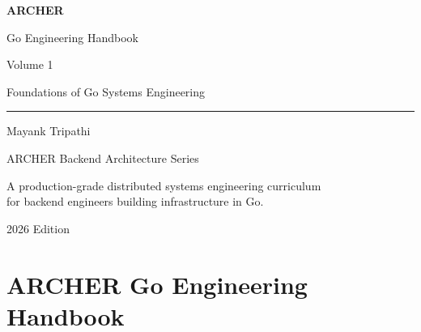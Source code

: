 \documentclass[11pt,openany]{book}
\author{}
\date{}
\begin{document}

\begin{titlepage}

\pagecolor{archerblue}
\color{white}

\vspace*{3cm}

\begin{center}

{\Huge \bfseries ARCHER}

\vspace{0.5cm}

{\Huge Go Engineering Handbook}

\vspace{1cm}

{\LARGE Volume 1}

\vspace{0.5cm}

{\Large Foundations of Go Systems Engineering}

\vspace{2cm}

\rule{0.8\textwidth}{0.5pt}

\vspace{1cm}

{\Large Mayank Tripathi}

\vspace{0.5cm}

{\large ARCHER Backend Architecture Series}

\vfill

{\large
A production-grade distributed systems engineering curriculum \\
for backend engineers building infrastructure in Go.
}

\vspace{2cm}

{\large 2026 Edition}

\end{center}

\end{titlepage}

\nopagecolor

\frontmatter

\tableofcontents

\newpage

\mainmatter

\hypertarget{archer-go-engineering-handbook}{%
\section{ARCHER Go Engineering
Handbook}\label{archer-go-engineering-handbook}}
\end{document}
